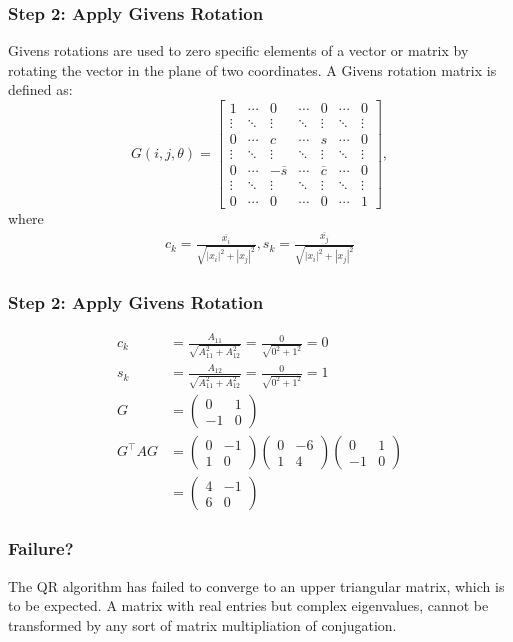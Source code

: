 \documentclass{beamer}
\theoremstyle{remark}
\newcommand{\myvec}[1]{\ensuremath{\begin{pmatrix}#1\end{pmatrix}}}
\numberwithin{equation}{section}
\begin{document}
\begin{frame}
\frametitle{Step 2: Apply Givens Rotation}
Givens rotations are used to zero specific elements of a vector or matrix by rotating the vector in the plane of two coordinates. A Givens rotation matrix is defined as:
\[
G(i, j, \theta) =
\begin{bmatrix}
1 & \cdots & 0 & \cdots & 0 & \cdots & 0 \\
\vdots & \ddots & \vdots & \ddots & \vdots & \ddots & \vdots \\
0 & \cdots & c & \cdots & s & \cdots & 0 \\
\vdots & \ddots & \vdots & \ddots & \vdots & \ddots & \vdots \\
0 & \cdots & -\overline{s} & \cdots & \overline{c} & \cdots & 0 \\
\vdots & \ddots & \vdots & \ddots & \vdots & \ddots & \vdots \\
0 & \cdots & 0 & \cdots & 0 & \cdots & 1
\end{bmatrix},
\]
where 
\begin{align}
    c_k = \frac{\overline{x_i}}{\sqrt{|x_i|^2 + |x_j|^2}},
    s_k = \frac{\overline{x_j}}{\sqrt{|x_i|^2 + |x_j|^2}}   
\end{align}
\end{frame}
\begin{frame}
\frametitle{Step 2: Apply Givens Rotation}
\begin{align}
  c_k &= \frac{A_{11}}{\sqrt{A_{11}^2 + A_{12}^2}} = \frac{0}{\sqrt{0^2 + 1^2}} = 0\\
  s_k &= \frac{A_{12}}{\sqrt{A_{11}^2 + A_{12}^2}}= \frac{0}{\sqrt{0^2 + 1^2}} = 1\\
  G &=\myvec{0 & 1\\-1 & 0}\\
  G^{\top}AG &= \myvec{0 & -1\\1 & 0}\myvec{0 & -6\\1 & 4}\myvec{0 & 1\\-1 & 0}\\
  &= \myvec{4 & -1\\6 & 0}
\end{align}
\end{frame}
\begin{frame}
  \frametitle{Failure?}
The QR algorithm has failed to converge to an upper triangular matrix, which is to be expected.
A matrix with real entries but complex eigenvalues, cannot be transformed by any sort of matrix 
multipliation of conjugation.
\end{frame}
\end{document}
